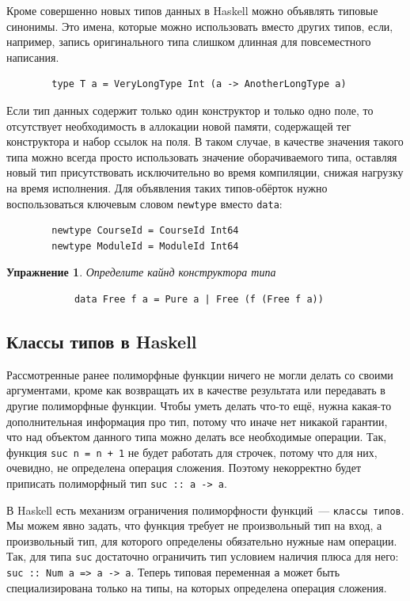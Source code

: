 \documentclass[12pt]{article}
\newtheorem{task}{Упражнение}
\begin{document}
    Кроме совершенно новых типов данных в Haskell можно объявлять типовые синонимы.
    Это имена, которые можно использовать вместо других типов, если, например, запись оригинального типа слишком длинная для повсеместного написания.
    \begin{verbatim}
        type T a = VeryLongType Int (a -> AnotherLongType a)
    \end{verbatim}

    Если тип данных содержит только один конструктор и только одно поле, то отсутствует необходимость в аллокации новой памяти, содержащей тег конструктора и набор ссылок на поля.
    В таком случае, в качестве значения такого типа можно всегда просто использовать значение оборачиваемого типа, оставляя новый тип присутствовать исключительно во время компиляции, снижая нагрузку на время исполнения.
    Для объявления таких типов-обёрток нужно воспользоваться ключевым словом \texttt{newtype} вместо \texttt{data}:
    \begin{verbatim}
        newtype CourseId = CourseId Int64
        newtype ModuleId = ModuleId Int64
    \end{verbatim}

    \begin{task}
        Определите кайнд конструктора типа
        \begin{verbatim}
            data Free f a = Pure a | Free (f (Free f a))
        \end{verbatim}
    \end{task}

    \subsection{Классы типов в Haskell}

    Рассмотренные ранее полиморфные функции ничего не могли делать со своими аргументами, кроме как возвращать их в качестве результата или передавать в другие полиморфные функции.
    Чтобы уметь делать что-то ещё, нужна какая-то дополнительная информация про тип, потому что иначе нет никакой гарантии, что над объектом данного типа можно делать все необходимые операции.
    Так, функция \texttt{suc n = n + 1} не будет работать для строчек, потому что для них, очевидно, не определена операция сложения.
    Поэтому некорректно будет приписать полиморфный тип \texttt{suc :: a -> a}.

    В Haskell есть механизм ограничения полиморфности функций~--- \texttt{классы типов}.
    Мы можем явно задать, что функция требует не произвольный тип на вход, а произвольный тип, для которого определены обязательно нужные нам операции.
    Так, для типа \texttt{suc} достаточно ограничить тип условием наличия плюса для него: \texttt{suc :: Num a => a -> a}.
    Теперь типовая переменная \texttt{a} может быть специализирована только на типы, на которых определена операция сложения.
\end{document}
